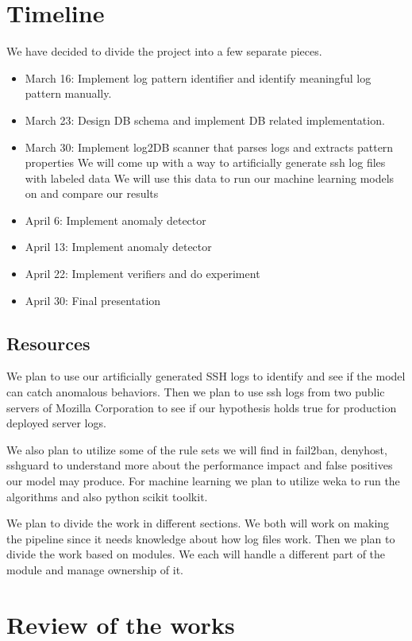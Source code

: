 \documentclass [11pt]{article}
\begin{document}
\section{Timeline}

We have decided to divide the project into a few separate pieces. 
\begin{itemize}
\item March 16: Implement log pattern identifier and identify meaningful log pattern manually. 
\item March 23: Design DB schema and implement DB related implementation.
\item March 30: Implement log2DB scanner that parses logs and extracts pattern properties
\subitem We will come up with a way to artificially generate ssh log files with labeled data
\subitem We will use this data to run our machine learning models on and compare our results
\item April 6: Implement anomaly detector
\item April 13: Implement anomaly detector
\item April 22: Implement verifiers and do experiment
\item April 30: Final presentation

\end{itemize}


\subsection{Resources}

We plan to use our artificially generated SSH logs to identify and see if the model can catch anomalous behaviors. Then we plan to use ssh logs from two public servers of Mozilla Corporation to see if our hypothesis holds true for production deployed server logs.

We also plan to utilize some of the rule sets we will find in fail2ban, denyhost, sshguard to understand more about the performance impact and false positives our model may produce. For machine learning we plan to utilize weka to run the algorithms and also python scikit toolkit.

We plan to divide the work in different sections. We both will work on making the pipeline since it needs knowledge about how log files work. Then we plan to divide the work based on modules. We each will handle a different part of the module and manage ownership of it.



\section{Review of the works}
\end{document}
